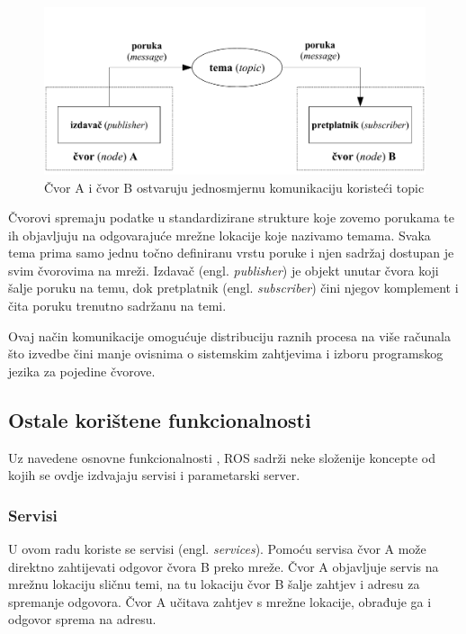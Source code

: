 \documentclass[times, utf8, diplomski, numeric]{fer}
\begin{document}
\begin{figure}[h!]
\begin{center}
\includegraphics[width=\textwidth]{ros_shema}
\caption{Čvor A i čvor B ostvaruju jednosmjernu komunikaciju koristeći topic}
\end{center}
\end{figure}

Čvorovi spremaju podatke u standardizirane strukture koje zovemo porukama te ih objavljuju na odgovarajuće mrežne lokacije koje nazivamo temama. 
Svaka tema prima samo jednu točno definiranu vrstu poruke i njen sadržaj dostupan je svim čvorovima na mreži.
Izdavač (engl. \textit{publisher}) je objekt unutar čvora koji šalje poruku na temu, dok pretplatnik (engl. \textit{subscriber}) čini njegov komplement i čita poruku trenutno sadržanu na temi.

Ovaj način komunikacije omogućuje distribuciju raznih procesa na više računala što izvedbe čini manje ovisnima o sistemskim zahtjevima i izboru programskog jezika za pojedine čvorove. 

\subsection{Ostale korištene funkcionalnosti}
Uz navedene osnovne funkcionalnosti , ROS sadrži neke složenije koncepte od kojih se ovdje izdvajaju servisi i parametarski server. 

\subsubsection{Servisi}
U ovom radu koriste se servisi (engl. \textit{services}). 
Pomoću servisa čvor A može direktno zahtijevati odgovor čvora B preko mreže. 
Čvor A objavljuje servis na mrežnu lokaciju sličnu temi, na tu lokaciju čvor B šalje zahtjev i adresu za spremanje odgovora. 
Čvor A učitava zahtjev s mrežne lokacije, obrađuje ga i odgovor sprema na adresu.
\end{document}
